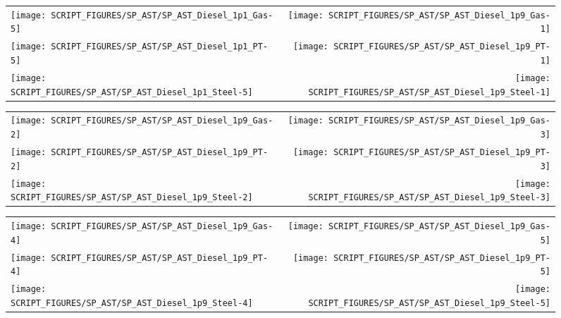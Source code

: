 \begin{figure}[p]
\begin{tabular*}{\textwidth}{l@{\extracolsep{\fill}}r}
\texttt{[image: SCRIPT\_FIGURES/SP\_AST/SP\_AST\_Diesel\_1p1\_Gas-5]}   &  \texttt{[image: SCRIPT\_FIGURES/SP\_AST/SP\_AST\_Diesel\_1p9\_Gas-1]}   \\
\texttt{[image: SCRIPT\_FIGURES/SP\_AST/SP\_AST\_Diesel\_1p1\_PT-5]}    &  \texttt{[image: SCRIPT\_FIGURES/SP\_AST/SP\_AST\_Diesel\_1p9\_PT-1]}    \\
\texttt{[image: SCRIPT\_FIGURES/SP\_AST/SP\_AST\_Diesel\_1p1\_Steel-5]} &  \texttt{[image: SCRIPT\_FIGURES/SP\_AST/SP\_AST\_Diesel\_1p9\_Steel-1]}
\end{tabular*}
\label{SP_Diesel_1p1_5m}
\end{figure}

\begin{figure}[p]
\begin{tabular*}{\textwidth}{l@{\extracolsep{\fill}}r}
\texttt{[image: SCRIPT\_FIGURES/SP\_AST/SP\_AST\_Diesel\_1p9\_Gas-2]}   &  \texttt{[image: SCRIPT\_FIGURES/SP\_AST/SP\_AST\_Diesel\_1p9\_Gas-3]}   \\
\texttt{[image: SCRIPT\_FIGURES/SP\_AST/SP\_AST\_Diesel\_1p9\_PT-2]}    &  \texttt{[image: SCRIPT\_FIGURES/SP\_AST/SP\_AST\_Diesel\_1p9\_PT-3]}    \\
\texttt{[image: SCRIPT\_FIGURES/SP\_AST/SP\_AST\_Diesel\_1p9\_Steel-2]} &  \texttt{[image: SCRIPT\_FIGURES/SP\_AST/SP\_AST\_Diesel\_1p9\_Steel-3]}
\end{tabular*}
\label{SP_Diesel_1p9_2m}
\end{figure}

\begin{figure}[p]
\begin{tabular*}{\textwidth}{l@{\extracolsep{\fill}}r}
\texttt{[image: SCRIPT\_FIGURES/SP\_AST/SP\_AST\_Diesel\_1p9\_Gas-4]}   &  \texttt{[image: SCRIPT\_FIGURES/SP\_AST/SP\_AST\_Diesel\_1p9\_Gas-5]}   \\
\texttt{[image: SCRIPT\_FIGURES/SP\_AST/SP\_AST\_Diesel\_1p9\_PT-4]}    &  \texttt{[image: SCRIPT\_FIGURES/SP\_AST/SP\_AST\_Diesel\_1p9\_PT-5]}    \\
\texttt{[image: SCRIPT\_FIGURES/SP\_AST/SP\_AST\_Diesel\_1p9\_Steel-4]} &  \texttt{[image: SCRIPT\_FIGURES/SP\_AST/SP\_AST\_Diesel\_1p9\_Steel-5]}
\end{tabular*}
\label{SP_Diesel_1p9_4m}
\end{figure}

